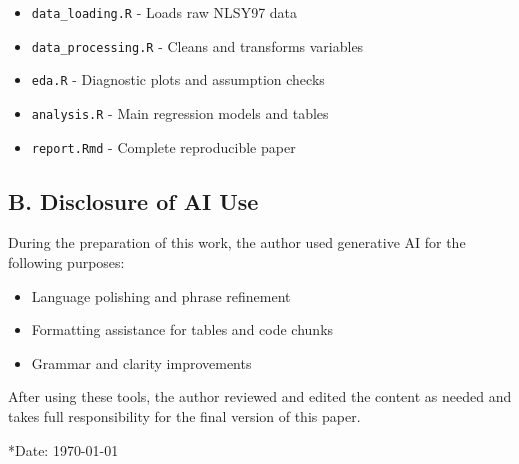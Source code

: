 \documentclass[
  12pt,
]{article}
\providecommand{\tightlist}{%
  \setlength{\itemsep}{0pt}\setlength{\parskip}{0pt}}
\begin{document}
\begin{itemize}
\item
  \texttt{data\_loading.R} - Loads raw NLSY97 data
\item
  \texttt{data\_processing.R} - Cleans and transforms variables
\item
  \texttt{eda.R} - Diagnostic plots and assumption checks
\item
  \texttt{analysis.R} - Main regression models and tables
\item
  \texttt{report.Rmd} - Complete reproducible paper
\end{itemize}

\subsection{B. Disclosure of AI Use}\label{b.-disclosure-of-ai-use}

During the preparation of this work, the author used generative AI for
the following purposes:

\begin{itemize}
\tightlist
\item
  Language polishing and phrase refinement
\item
  Formatting assistance for tables and code chunks
\item
  Grammar and clarity improvements
\end{itemize}

After using these tools, the author reviewed and edited the content as
needed and takes full responsibility for the final version of this
paper.

\vspace{0.25in}

*Date: \today*
\end{document}

